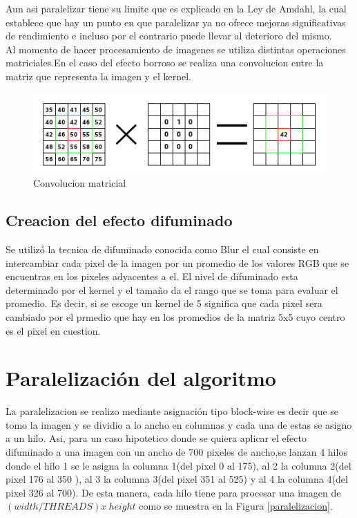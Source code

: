 \documentclass{IEEEtran}
\begin{document}
Aun asi paralelizar tiene su limite que es explicado en la 
Ley de Amdahl, la cual establece que hay un punto en que 
paralelizar ya no ofrece mejoras significativas de rendimiento
 e incluso por el contrario puede llevar al deterioro del mismo.\\

Al momento de hacer procesamiento de imagenes se utiliza distintas 
operaciones matriciales.En el caso del efecto borroso se realiza 
una convolucion entre la matriz que representa la imagen y el kernel.

\begin{figure}[H]
  \includegraphics[width=\linewidth]{matriz.png}
  \caption{Convolucion matricial}
  \label{fig:boat1}
\end{figure}
\subsection{Creacion del efecto difuminado}

Se utilizó la tecnica de difuminado conocida 
como Blur el cual consiste en intercambiar cada pixel de la imagen 
por un promedio de los valores RGB que se encuentras en los pixeles 
adyacentes a el. El nivel de difuminado esta determinado por el 
kernel y el tamaño da el rango que se toma para evaluar el promedio.
 Es decir, si se escoge un kernel de 5 significa que cada pixel sera
  cambiado por el prmedio que hay en los promedios de la matriz 5x5
   cuyo centro es el pixel en cuestion.

\section{Paralelización del algoritmo}
La paralelizacion se realizo mediante asignación tipo block-wise
 es decir que se tomo la imagen y se dividio a lo ancho en columnas
  y cada una de estas se asigno a un hilo. 
Asi, para un caso hipotetico donde se quiera aplicar el efecto 
difuminado a una imagen con un ancho de 700 pixeles de ancho,se lanzan 4
 hilos donde el hilo 1 se le asigna la columna 1(del pixel 0 al 175), 
 al 2 la columna 2(del pixel 176 al 350 ), al 3 la columna 3(del 
 pixel 351 al 525)  y al 4 la  columna 4(del pixel 326 al 700). 
 De esta manera, cada hilo tiene para procesar una imagen de
 $(width/THREADS) x \ height$ como se muestra en
  la Figura \ref{paralelizacion}.
\end{document}
